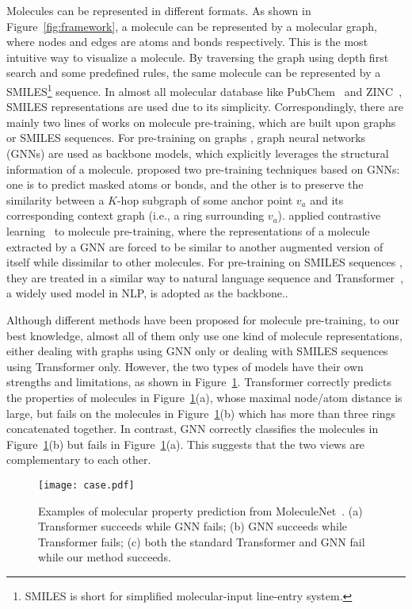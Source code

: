 \documentclass{article}
\begin{document}
Molecules can be represented in different formats. As shown in Figure~\ref{fig:framework}, a molecule can be represented by a molecular graph, where nodes and edges are atoms and bonds respectively. This is the most intuitive way to visualize a molecule. By traversing the graph using depth first search and some predefined rules, the same molecule can be represented by a SMILES\footnote{SMILES is short for simplified molecular-input line-entry system.} \cite{weininger1988smiles} sequence. In almost all molecular database like PubChem~\cite{10.1093/nar/gkaa971} and ZINC~\cite{doi:10.1021/ci049714}, SMILES representations are used due to its simplicity. Correspondingly, there are mainly two lines of works on molecule pre-training, which are built upon graphs or  SMILES sequences. For pre-training on graphs \citep{hu2019strategies,liu2019ngram,wang2021molclr}, graph neural networks (GNNs) are used as backbone models, which explicitly leverages the structural information of a molecule. \citet{hu2019strategies} proposed two pre-training techniques based on GNNs: one is to predict masked atoms or bonds, and the other is to preserve the similarity between a $K$-hop subgraph of some anchor point $v_a$ and its corresponding context graph (i.e., a ring surrounding $v_a$). \citet{wang2021molclr} applied contrastive learning~\cite{1640964} to molecule pre-training, where the representations of a molecule extracted by a GNN are forced to be similar to another augmented version of itself while dissimilar to other molecules. For pre-training on SMILES sequences \citep{chithrananda2020chemberta}, they are treated in a similar way to natural language sequence and Transformer~\cite{vaswani2017attention}, a widely used model in NLP, is adopted as the backbone.. 

Although different methods have been proposed for molecule pre-training, to our best knowledge, almost all of them only use one kind of molecule representations, either dealing with graphs using GNN only or dealing with SMILES sequences using Transformer only. However, the two types of models have their own strengths and limitations, as shown in Figure~\ref{fig:case_study_in_motivation}. Transformer correctly predicts the properties of molecules in Figure~\ref{fig:case_study_in_motivation}(a), whose maximal node/atom distance is large, but fails on the molecules in Figure~\ref{fig:case_study_in_motivation}(b) which has more than three rings concatenated together.
In contrast, GNN correctly classifies the molecules in Figure~\ref{fig:case_study_in_motivation}(b) but fails in Figure~\ref{fig:case_study_in_motivation}(a). This suggests that the two views are complementary to each other.
\begin{figure}[!ht]
    \centering
    \texttt{[image: case.pdf]}
    \caption{Examples of molecular property prediction from MoleculeNet~\cite{wu2018moleculenet}. (a) Transformer succeeds while GNN fails; (b) GNN succeeds while Transformer fails; (c) both the standard Transformer and GNN fail while our method succeeds. }
    \label{fig:case_study_in_motivation}
\end{figure}
\end{document}
